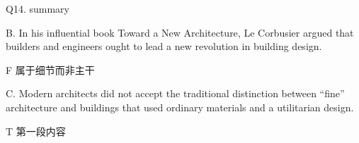 \begin{blk}
    \begin{qst}
        Q14. summary
    \end{qst}

    \begin{chc}
        B. In his influential book Toward a New Architecture, Le Corbusier argued that builders and engineers ought to lead a new revolution in building design.
    \end{chc}

    \begin{nlz}
        F 属于细节而非主干
    \end{nlz}

    \begin{chc}
        C. Modern architects did not accept the traditional distinction between “fine” architecture and buildings that used ordinary materials and a utilitarian design.
    \end{chc}

    \begin{nlz}
        T 第一段内容
    \end{nlz}
\end{blk}

\newpage